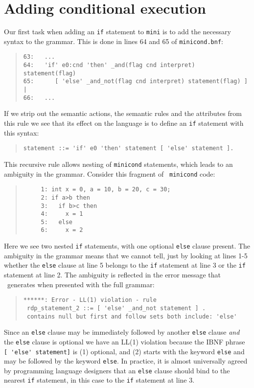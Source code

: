\section{Adding conditional execution}
\label{conditionals}
Our first task when adding an {\tt if} statement to {\tt mini} is to add
the necessary syntax
to the grammar. This is done in lines 64 and 65 of {\tt minicond.bnf}:
\begin{quote}
\small
\begin{verbatim}
63:   ...
64:   'if' e0:cnd 'then' _and(flag cnd interpret) statement(flag)
65:      [ 'else' _and_not(flag cnd interpret) statement(flag) ] |
66:   ...
\end{verbatim}
\end{quote}
If we strip out the semantic actions, the semantic rules and the attributes from this rule 
we see that its effect on the language is to define an {\tt if} statement with this syntax:
\begin{quote}
\small
\begin{verbatim}
statement ::= 'if' e0 'then' statement [ 'else' statement ].
\end{verbatim}
\end{quote}

This recursive rule allows nesting of {\tt minicond} statements, which
leads to an ambiguity in the grammar. Consider this fragment of {\tt
minicond} code:
\begin{quote}
\small
\begin{verbatim}
     1: int x = 0, a = 10, b = 20, c = 30;
     2: if a>b then
     3:   if b>c then
     4:     x = 1
     5:   else
     6:     x = 2
\end{verbatim}
\end{quote}
Here we see two nested {\tt if} statements, with one optional
{\tt else} clause present. The ambiguity in the grammar means that
we cannot tell, just by looking at lines 1-5 whether the {\tt else}
clause at line 5 belongs to the {\tt if} statement at line 3 or the 
{\tt if} statement at line 2. The ambiguity is reflected in the error
message that \rdp\ generates when presented with the full grammar:
\begin{quote}
\small
\begin{verbatim}
******: Error - LL(1) violation - rule
 rdp_statement_2 ::= [ 'else' _and_not statement ] .
 contains null but first and follow sets both include: 'else'
\end{verbatim}
\end{quote}
Since an {\tt else} clause may be immediately followed by another 
{\tt else} clause {\em and} the {\tt else} clause is optional we have
an LL(1) violation because the IBNF phrase \verb+[ 'else' statement]+
is (1) optional,  and (2) starts with the keyword {\tt else} and may be followed
by the keyword {\tt else}.
In practice, it is almost universally agreed by programming language designers
that an {\tt else} clause should bind to the nearest {\tt if} statement, in this
case to the {\tt if} statement at line 3.

